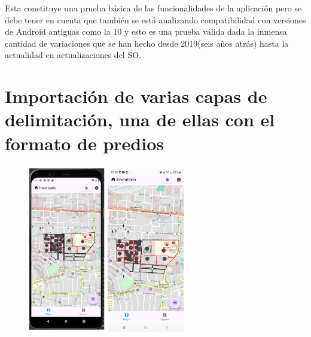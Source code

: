 Esta constituye una prueba básica de las funcionalidades de la aplicación pero se debe tener en cuenta que también se está analizando compatibilidad
con versiones de Android antiguas como la 10 y esto es una prueba válida dada la inmensa cantidad de variaciones que se han hecho desde 2019(seis años atrás)
hasta la actualidad en actualizaciones del SO.

\pagebreak
\section{Importación de varias capas de delimitación, una de ellas con el formato de predios}
\begin{figure}[h]
    \includegraphics[width=0.3\textwidth]{Graphics/Capitulo 4/Pixel 4 [emulador]/4.3/1.png}
    \includegraphics[width=0.3\textwidth]{Graphics/Capitulo 4/Galaxy S23 Ultra Android/4.3/4.jpg}

\end{figure}
